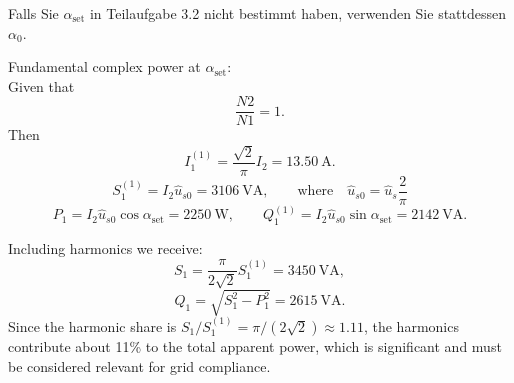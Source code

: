 \begin{germanhintblock}
	Falls Sie $\alpha_\mathrm{set}$ in Teilaufgabe 3.2 nicht bestimmt haben, verwenden Sie stattdessen $\alpha_0$.
\end{germanhintblock}
\begin{solutionblock}
	Fundamental complex power at $\alpha_{\mathrm{set}}$:\\
	Given that $$\frac{N2}{N1} = 1.$$
	Then
	$$I_1^{(1)}=\frac{\sqrt{2}}{\pi}I_2=\SI{13.50}{\ampere}.$$
	$$S_1^{(1)}=I_2\hat{u}_{s0}=\SI{3106}{\volt\ampere}, \qquad \text{where} \quad \hat{u}_{s0} = \hat{u}_{s}\frac{2}{\pi}$$
	$$P_1=I_2\hat{u}_{s0}\cos\alpha_{\mathrm{set}}=\SI{2250}{\watt},\qquad
		Q_1^{(1)}=I_2\hat{u}_{s0}\sin\alpha_{\mathrm{set}}=\SI{2142}{\volt\ampere}.$$
\end{solutionblock}
\begin{solutionblock}
	Including harmonics we receive:
	$$S_1=\frac{\pi}{2\sqrt{2}}S_1^{(1)}=\SI{3450}{\volt\ampere},$$
	$$Q_1=\sqrt{S_1^2-P_1^2}=\SI{2615}{\volt\ampere}.$$
	Since the harmonic share is $S_1/S_1^{(1)}=\pi/(2\sqrt{2})\approx 1.11$, the harmonics contribute about 11\% to the total apparent power, which is significant and must be considered relevant for grid compliance.
\end{solutionblock}